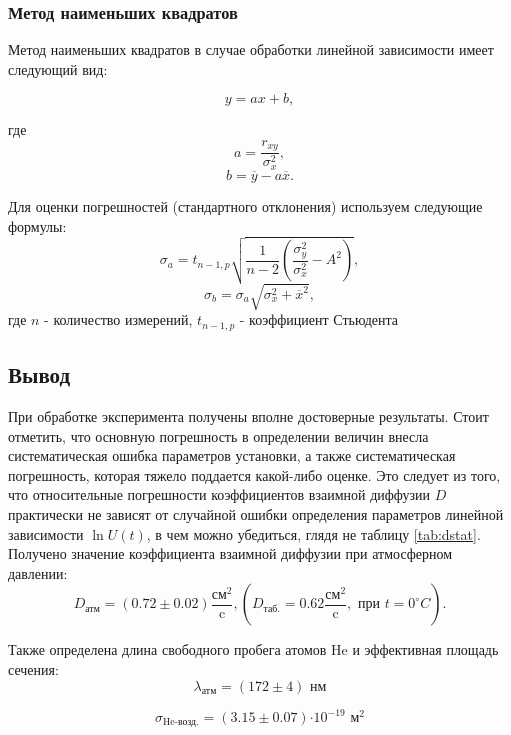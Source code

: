 \documentclass[12pt,a4paper]{article}
\newcommand{\e}[1]{\text{$\cdot10^{#1}$}}
\begin{document}
\subsubsection*{Метод наименьших квадратов}
Метод наименьших квадратов в случае обработки линейной зависимости имеет следующий вид:

$$y = ax + b,$$

где $$a = \frac{r_{xy}}{ \sigma_x^2},$$
$$b = \overline{y} - a\overline{x}.$$

Для оценки погрешностей (стандартного отклонения) используем следующие формулы:
$$\sigma_a =  t_{n-1, p} \sqrt{\frac{1}{n-2} \left( \frac{\sigma_y^2}{\sigma_x^2} - A^2 \right)},$$
$$\sigma_b = \sigma_a \sqrt{\sigma_x^2 + \overline{x}^2},$$
где 
$n$ - количество измерений, $ t_{n-1, p}$ - коэффициент Стьюдента



\clearpage
\subsection*{Вывод}
При обработке эксперимента получены вполне достоверные результаты.
Стоит отметить, что основную погрешность в определении величин внесла систематическая ошибка параметров установки, а также систематическая погрешность, которая тяжело поддается какой-либо оценке. Это следует из того, что относительные погрешности коэффициентов взаимной диффузии $D$ практически не зависят от случайной ошибки определения параметров линейной зависимости $\ln{U}(t)$, в чем можно убедиться, глядя не таблицу \ref{tab:dstat}. 
Получено значение коэффициента взаимной диффузии при атмосферном давлении:
$$D_\text{атм} = (0.72\pm 0.02)\frac{\text{см}^2}{\text{c}}, \left( D_\text{таб.} = 0.62 \frac{\text{см}^2}{\text{c}}, \text{ при } t = 0^{\circ} C\right).$$

Также определена длина свободного пробега атомов He и эффективная площадь сечения:
$$\lambda_{\text{атм}} = (172 \pm 4) \text{ нм}$$

$$\sigma_{\text{He-возд.}} = (3.15 \pm 0.07)\e{-19} \text{ м}^2$$
\end{document}
